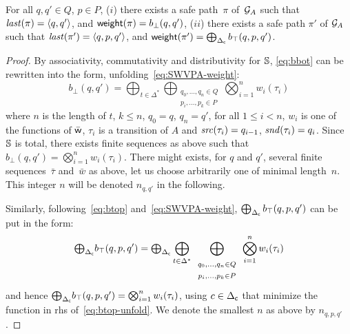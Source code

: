 \begin{lemma}[Completeness] \label{algo-complete}
For all $q, q' \in Q$, $p\in P$, 
($i$) there exists a safe path~$\pi$ of~$\mathcal{G}_A$ such that
$\last(\pi) = \< q, q'>$,
and $\mathsf{weight}(\pi) = b_\bot(q, q')$, 
($ii$) there exists a safe path $\pi'$ of $\mathcal{G}_A$ 
such that $\last(\pi') = \< q, p, q'>$,
and $\mathsf{weight}(\pi') = \bigoplus_{\Delta_\mathsf{c}} b_\top(q, p, q')$.
\end{lemma}
%
\begin{proof}
By associativity, commutativity and distributivity for $\mathbb{S}$,
\eqref{eq:bbot} can be rewritten into the form, unfolding~\eqref{eq:SWVPA-weight}:
%
\begin{equation}\label{eq:bbot-unfold}
b_\bot(q, q') = 
\bigoplus_{t\in \Delta^*} 
\bigoplus_{\begin{array}{c}
           \scriptstyle q_0,\ldots, q_n \in Q\\
           \scriptstyle p_{i},\ldots, p_{k} \in P
           \end{array}}
\bigotimes_{i=1}^n w_i(\tau_i)           
\end{equation}
%
where $n$ is the length of $t$, $k \leq n$,
$q_0 = q$, $q_n = q'$, 
for all $1 \leq i < n$, 
$w_i$ is one of the functions of $\bar{\mathsf{w}}$,
$\tau_i$ is a transition of $A$ and
$\mathit{src}(\tau_i) = q_{i-1}$, $\mathit{snd}(\tau_i) = q_i$.
%
Since $\mathbb{S}$ is total, there exists finite sequences as above such that
\( b_\bot(q, q') = \bigotimes_{i=1}^n w_i(\tau_i)\).
%
There might exists, for $q$ and $q'$,
several finite sequences~$\bar\tau$ and~$\bar{w}$ as above, 
let us choose arbitrarily one of minimal length~$n$. 
This integer $n$ will be denoted $n_{q, q'}$ in the following.

Similarly, following~\eqref{eq:btop} and~\eqref{eq:SWVPA-weight}, 
$\bigoplus_{\Delta_\mathsf{c}} b_\top(q, p, q')$ can be put in the form:
%
\begin{equation}\label{eq:btop-unfold}
{\textstyle\bigoplus_{\Delta_\mathsf{c}}} b_\top(q, p, q') = 
{\textstyle\bigoplus_{\Delta_\mathsf{c}}} \bigoplus_{t\in \Delta^*} 
\bigoplus_{\begin{array}{c}
           \scriptstyle q_0,\ldots, q_n \in Q\\
           \scriptstyle p_{i},\ldots, p_{k} \in P
           \end{array}}
\bigotimes_{i=1}^n w_i(\tau_i)           
\end{equation}
%
and hence 
\( {\textstyle\bigoplus_{\Delta_\mathsf{c}}} b_\top(q, p, q') = \bigotimes_{i=1}^n w_i(\tau_i) \),
using $c \in {\Delta_\mathsf{c}}$ that minimize the function in rhs of~\eqref{eq:btop-unfold}.
We denote the smallest $n$ as above by $n_{q, p, q'}$.


\end{proof}
